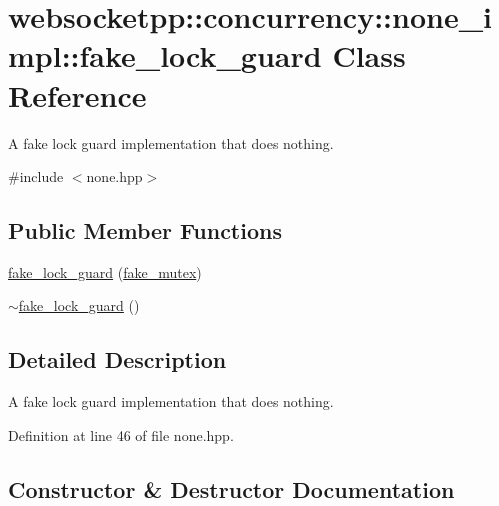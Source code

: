 \hypertarget{classwebsocketpp_1_1concurrency_1_1none__impl_1_1fake__lock__guard}{}\section{websocketpp\+:\+:concurrency\+:\+:none\+\_\+impl\+:\+:fake\+\_\+lock\+\_\+guard Class Reference}
\label{classwebsocketpp_1_1concurrency_1_1none__impl_1_1fake__lock__guard}


A fake lock guard implementation that does nothing.  




{\ttfamily \#include $<$none.\+hpp$>$}

\subsection*{Public Member Functions}
\begin{DoxyCompactItemize}
\item 
\hyperlink{classwebsocketpp_1_1concurrency_1_1none__impl_1_1fake__lock__guard_a6b1764d95374ca8e341e187427088150}{fake\+\_\+lock\+\_\+guard} (\hyperlink{classwebsocketpp_1_1concurrency_1_1none__impl_1_1fake__mutex}{fake\+\_\+mutex})
\item 
\hyperlink{classwebsocketpp_1_1concurrency_1_1none__impl_1_1fake__lock__guard_a727b1ccbb3e732fae072820dcced7a49}{$\sim$fake\+\_\+lock\+\_\+guard} ()
\end{DoxyCompactItemize}


\subsection{Detailed Description}
A fake lock guard implementation that does nothing. 

Definition at line 46 of file none.\+hpp.



\subsection{Constructor \& Destructor Documentation}
\hypertarget{classwebsocketpp_1_1concurrency_1_1none__impl_1_1fake__lock__guard_a6b1764d95374ca8e341e187427088150}{}
